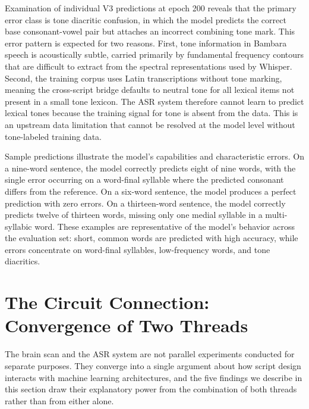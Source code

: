 \documentclass[11pt]{article}
\begin{document}
Examination of individual V3 predictions at epoch 200 reveals that the primary error class is tone diacritic confusion, in which the model predicts the correct base consonant-vowel pair but attaches an incorrect combining tone mark. This error pattern is expected for two reasons. First, tone information in Bambara speech is acoustically subtle, carried primarily by fundamental frequency contours that are difficult to extract from the spectral representations used by Whisper. Second, the training corpus uses Latin transcriptions without tone marking, meaning the cross-script bridge defaults to neutral tone for all lexical items not present in a small tone lexicon. The ASR system therefore cannot learn to predict lexical tones because the training signal for tone is absent from the data. This is an upstream data limitation that cannot be resolved at the model level without tone-labeled training data.

Sample predictions illustrate the model's capabilities and characteristic errors. On a nine-word sentence, the model correctly predicts eight of nine words, with the single error occurring on a word-final syllable where the predicted consonant differs from the reference. On a six-word sentence, the model produces a perfect prediction with zero errors. On a thirteen-word sentence, the model correctly predicts twelve of thirteen words, missing only one medial syllable in a multi-syllabic word. These examples are representative of the model's behavior across the evaluation set: short, common words are predicted with high accuracy, while errors concentrate on word-final syllables, low-frequency words, and tone diacritics.

\section{The Circuit Connection: Convergence of Two Threads}
\label{sec:circuit_connection}

The brain scan and the ASR system are not parallel experiments conducted for separate purposes. They converge into a single argument about how script design interacts with machine learning architectures, and the five findings we describe in this section draw their explanatory power from the combination of both threads rather than from either alone.
\end{document}
